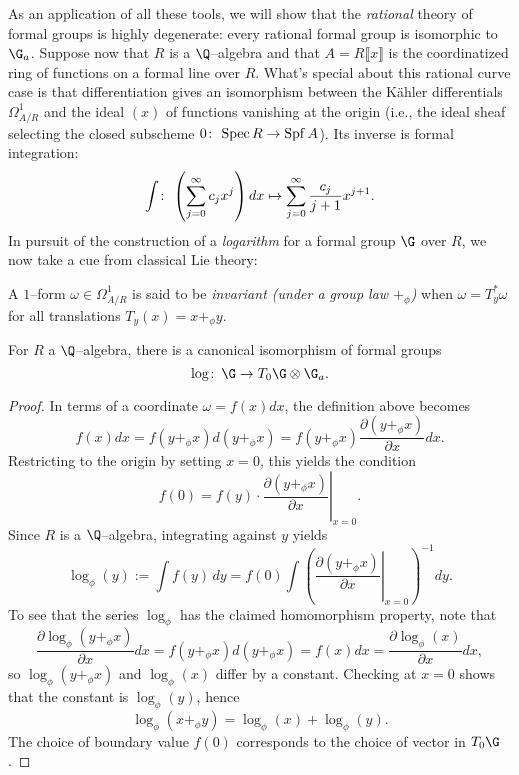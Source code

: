 As an application of all these tools, we will show that the \emph{rational} theory of formal groups is highly degenerate: every rational formal group is isomorphic to $\G_a$.  Suppose now that $R$ is a $\Q$--algebra and that $A = R\llbracket x \rrbracket$ is the coordinatized ring of functions on a formal line over $R$.  What's special about this rational curve case is that differentiation gives an isomorphism between the K\"ahler differentials $\Omega^1_{A/R}$ and the ideal $(x)$ of functions vanishing at the origin (i.e., the ideal sheaf selecting the closed subscheme $0\colon\thinspace \operatorname{Spec} R \to \operatorname{Spf} A$).  Its inverse is formal integration: \[\int \colon\thinspace \left(\sum_{j=0}^\infty c_j x^j \right) dx \mapsto \sum_{j=0}^\infty \frac{c_j}{j+1} x^{j+1}.\]  In pursuit of the construction of a \textit{logarithm} for a formal group $\G$ over $R$, we now take a cue from classical Lie theory:
\begin{definition}
A $1$--form $\omega \in \Omega^1_{A/R}$ is said to be \textit{invariant (under a group law $+_\phi$)} when $\omega = T_y^* \omega$ for all translations $T_y(x) = x +_\phi y$.
\end{definition}

\begin{theorem}\label{RationalFGLsHaveLogarithms}
For $R$ a $\Q$--algebra, there is a canonical isomorphism of formal groups \[\log\co \G \to T_0 \G \otimes \G_a.\]
\end{theorem}
\begin{proof}
In terms of a coordinate $\omega = f(x) dx$, the definition above becomes \[f(x) dx = f(y +_\phi x) d(y +_\phi x) = f(y +_\phi x) \frac{\partial(y +_\phi x)}{\partial x} dx.\]  Restricting to the origin by setting $x = 0$, this yields the condition \[f(0) = f(y) \cdot \left. \frac{\partial(y +_\phi x)}{\partial x} \right|_{x=0}.\]  Since $R$ is a $\Q$--algebra, integrating against $y$ yields \[\log_\phi(y) := \int f(y) \, dy = f(0) \int \left( \left. \frac{\partial(y +_\phi x)}{\partial x} \right|_{x=0} \right)^{-1} dy.\]  To see that the series $\log_\phi$ has the claimed homomorphism property, note that \[\frac{\partial \log_\phi(y +_\phi x)}{\partial x} dx = f(y +_\phi x) d(y +_\phi x) = f(x) dx = \frac{\partial \log_\phi(x)}{\partial x} dx,\] so $\log_\phi(y +_\phi x)$ and $\log_\phi(x)$ differ by a constant.  Checking at $x = 0$ shows that the constant is $\log_\phi(y)$, hence \[\log_\phi(x +_\phi y) = \log_\phi(x) + \log_\phi(y).\]  The choice of boundary value $f(0)$ corresponds to the choice of vector in $T_0 \G$.
\end{proof}

